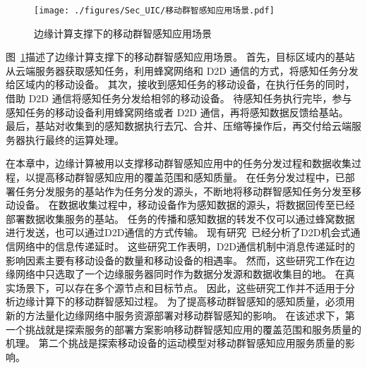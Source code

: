 \begin{figure}[!b]
  \centering
  \vspace{-1em}
  \texttt{[image: ./figures/Sec\_UIC/移动群智感知应用场景.pdf]}
  \vspace{-0.5em}
  \caption{边缘计算支撑下的移动群智感知应用场景}
  \vspace{-1em}
  \label{Figure_UIC_MCS}
\end{figure}

图~\ref{Figure_UIC_MCS}描述了边缘计算支撑下的移动群智感知应用场景。
首先，目标区域内的基站从云端服务器获取感知任务，利用蜂窝网络和 D2D 通信的方式，将感知任务分发给区域内的移动设备。
其次，接收到感知任务的移动设备，在执行任务的同时，借助 D2D 通信将感知任务分发给相邻的移动设备。
待感知任务执行完毕，参与感知任务的移动设备利用蜂窝网络或者 D2D 通信，再将感知数据反馈给基站。
最后，基站对收集到的感知数据执行去冗、合并、压缩等操作后，再交付给云端服务器执行最终的运算处理。


在本章中，边缘计算被用以支撑移动群智感知应用中的任务分发过程和数据收集过程，以提高移动群智感知应用的覆盖范围和感知质量。
在任务分发过程中，已部署任务分发服务的基站作为任务分发的源头，不断地将移动群智感知任务分发至移动设备。
在数据收集过程中，移动设备作为感知数据的源头，将数据回传至已经部署数据收集服务的基站。
任务的传播和感知数据的转发不仅可以通过蜂窝数据进行发送，也可以通过D2D通信的方式传输。
现有研究~\cite{DBLP:conf/wcnc/QinF13,DBLP:journals/twc/LiW14,DBLP:journals/winet/ZhaoMLT18}已经分析了D2D机会式通信网络中的信息传递延时。
这些研究工作表明，D2D通信机制中消息传递延时的影响因素主要有移动设备的数量和移动设备的相遇率。
然而，这些研究工作在边缘网络中只选取了一个边缘服务器同时作为数据分发源和数据收集目的地。
在真实场景下，可以存在多个源节点和目标节点。
因此，这些研究工作并不适用于分析边缘计算下的移动群智感知过程。
为了提高移动群智感知的感知质量，必须用新的方法量化边缘网络中服务资源部署对移动群智感知的影响。
在该述求下，第一个挑战就是探索服务的部署方案影响移动群智感知应用的覆盖范围和服务质量的机理。
第二个挑战是探索移动设备的运动模型对移动群智感知应用服务质量的影响。

